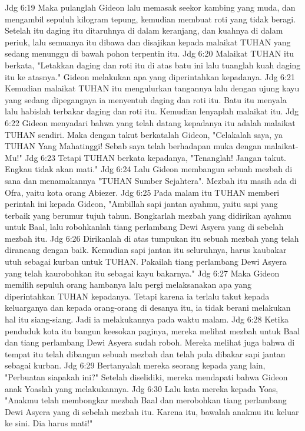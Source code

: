 Jdg 6:19  Maka pulanglah Gideon lalu memasak seekor kambing yang muda, dan mengambil sepuluh kilogram tepung, kemudian membuat roti yang tidak beragi. Setelah itu daging itu ditaruhnya di dalam keranjang, dan kuahnya di dalam periuk, lalu semuanya itu dibawa dan disajikan kepada malaikat TUHAN yang sedang menunggu di bawah pohon terpentin itu.
Jdg 6:20  Malaikat TUHAN itu berkata, "Letakkan daging dan roti itu di atas batu ini lalu tuanglah kuah daging itu ke atasnya." Gideon melakukan apa yang diperintahkan kepadanya.
Jdg 6:21  Kemudian malaikat TUHAN itu mengulurkan tangannya lalu dengan ujung kayu yang sedang dipegangnya ia menyentuh daging dan roti itu. Batu itu menyala lalu habislah terbakar daging dan roti itu. Kemudian lenyaplah malaikat itu.
Jdg 6:22  Gideon menyadari bahwa yang telah datang kepadanya itu adalah malaikat TUHAN sendiri. Maka dengan takut berkatalah Gideon, "Celakalah saya, ya TUHAN Yang Mahatinggi! Sebab saya telah berhadapan muka dengan malaikat-Mu!"
Jdg 6:23  Tetapi TUHAN berkata kepadanya, "Tenanglah! Jangan takut. Engkau tidak akan mati."
Jdg 6:24  Lalu Gideon membangun sebuah mezbah di sana dan menamakannya "TUHAN Sumber Sejahtera". Mezbah itu masih ada di Ofra, yaitu kota orang Abiezer.
Jdg 6:25  Pada malam itu TUHAN memberi perintah ini kepada Gideon, "Ambillah sapi jantan ayahmu, yaitu sapi yang terbaik yang berumur tujuh tahun. Bongkarlah mezbah yang didirikan ayahmu untuk Baal, lalu robohkanlah tiang perlambang Dewi Asyera yang di sebelah mezbah itu.
Jdg 6:26  Dirikanlah di atas tumpukan itu sebuah mezbah yang telah dirancang dengan baik. Kemudian sapi jantan itu seluruhnya, harus kaubakar utuh sebagai kurban untuk TUHAN. Pakailah tiang perlambang Dewi Asyera yang telah kaurobohkan itu sebagai kayu bakarnya."
Jdg 6:27  Maka Gideon memilih sepuluh orang hambanya lalu pergi melaksanakan apa yang diperintahkan TUHAN kepadanya. Tetapi karena ia terlalu takut kepada keluarganya dan kepada orang-orang di desanya itu, ia tidak berani melakukan hal itu siang-siang. Jadi ia melakukannya pada waktu malam.
Jdg 6:28  Ketika penduduk kota itu bangun keesokan paginya, mereka melihat mezbah untuk Baal dan tiang perlambang Dewi Asyera sudah roboh. Mereka melihat juga bahwa di tempat itu telah dibangun sebuah mezbah dan telah pula dibakar sapi jantan sebagai kurban.
Jdg 6:29  Bertanyalah mereka seorang kepada yang lain, "Perbuatan siapakah ini?" Setelah diselidiki, mereka mendapati bahwa Gideon anak Yoaslah yang melakukannya.
Jdg 6:30  Lalu kata mereka kepada Yoas, "Anakmu telah membongkar mezbah Baal dan merobohkan tiang perlambang Dewi Asyera yang di sebelah mezbah itu. Karena itu, bawalah anakmu itu keluar ke sini. Dia harus mati!"
